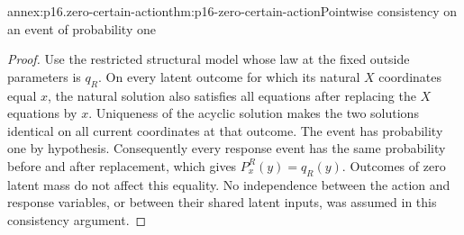 \begin{annexitem}{annex:p16.zero-certain-action}{thm:p16-zero-certain-action}{Pointwise consistency on an event of probability one}
\begin{proof}
Use the restricted structural model whose law at the fixed outside
parameters is \(q_R\). On every latent outcome for which its
natural \(X\) coordinates equal \(x\), the natural solution
also satisfies all equations after replacing the \(X\) equations
by \(x\). Uniqueness of the acyclic solution makes the two
solutions identical on all current coordinates at that outcome.
The event has probability one by hypothesis. Consequently every
response event has the same probability before and after replacement,
which gives \(P^R_x(y)=q_R(y)\). Outcomes of zero latent
mass do not affect this equality. No independence between the
action and response variables, or between their shared latent
inputs, was assumed in this consistency argument.
\end{proof}
\end{annexitem}

